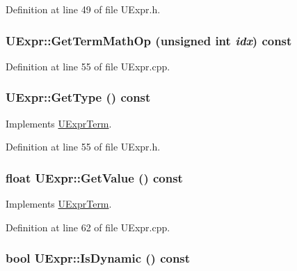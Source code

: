 \begin{CompactItemize}
Definition at line 49 of file UExpr.h.\hypertarget{class_u_expr_27a4662151061c4ae0dd5eee6cdc1aaf}{
\subsubsection[{GetTermMathOp}]{ UExpr::GetTermMathOp (unsigned int {\em idx}) const}}
\label{class_u_expr_27a4662151061c4ae0dd5eee6cdc1aaf}




Definition at line 55 of file UExpr.cpp.\hypertarget{class_u_expr_ff255fe132b396d771c34978d6e048f9}{
\subsubsection[{GetType}]{ UExpr::GetType () const}}
\label{class_u_expr_ff255fe132b396d771c34978d6e048f9}




Implements \hyperlink{class_u_expr_term_fc66ae4dfe6a112d107183840d753562}{UExprTerm}.

Definition at line 55 of file UExpr.h.\hypertarget{class_u_expr_0f499790b77709e3e29d845570e4f523}{
\subsubsection[{GetValue}]{\setlength{\rightskip}{0pt plus 5cm}float UExpr::GetValue () const}}
\label{class_u_expr_0f499790b77709e3e29d845570e4f523}




Implements \hyperlink{class_u_expr_term_85274403764fb0e4cc701a0374fd6592}{UExprTerm}.

Definition at line 62 of file UExpr.cpp.\hypertarget{class_u_expr_3c36d1cce1d3c4d2f5870fc5ced16d09}{
\subsubsection[{IsDynamic}]{\setlength{\rightskip}{0pt plus 5cm}bool UExpr::IsDynamic () const}}
\label{class_u_expr_3c36d1cce1d3c4d2f5870fc5ced16d09}





\end{CompactItemize}
